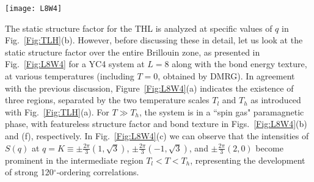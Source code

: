\documentclass[aps,prx,twocolumn,showpacs,psfig,superscriptaddress,longbibliography]{revtex4-1}
\newcommand{\Fig}[1]{Fig.~\ref{#1}}
\begin{document}
\begin{figure*}[tbp]
\texttt{[image: L8W4]}
\caption{(Color online)
 {(a) Finite-temperature phase diagram of TLH on a YC4 lattice, which consists of high-$T$ ``gas", intermediate-$T$ liquid, and low-$T$ solid states. (b-e) show the static structure factor at four representative temperature points (left to right, from high temperature to low), and (f-i) exhibit corresponding bond textures at finite-$T$, and the values are the bond energies to whose absolute value the thickness of nearest neighbor bonds are proportional. In (i) we also show the bond energy distribution at $T=0$ calculated by DMRG, where the agreement between XTRG results (left half) at low-$T$ and DMRG data (right half) is apparent, and one can recognize the strip solid structure quite distinctly. 
Dashed lines are guide for eyes, representing in (e) the line connecting two inequivalent $M$ points (labelled as $M_1$ and $M_2$) with enhanced intensity. In (f) we label the X and Y directions, as well as the way we wrap the lattice into a Y cylinder.}
}
\label{Fig:L8W4}
\end{figure*}


 {The static structure factor for the THL is analyzed at specific values
of $q$ in \Fig{Fig:TLH}(b). However, before discussing these in detail,
let us look at the static structure factor over the entire Brillouin zone,
as presented in \Fig{Fig:L8W4} for a YC4 system at $L=8$
along with the bond energy texture, at various temperatures (including $T=0$, obtained by DMRG). 
In agreement with the previous discussion,
Figure~\ref{Fig:L8W4}(a) indicates the existence of three regions, separated
by the two temperature scales $T_l$ and $T_h$ 
as introduced with \Fig{Fig:TLH}(a). For $T\gg T_h$, the system is in a ``spin gas" paramagnetic phase, with featureless structure factor and bond texture in Figs.~\ref{Fig:L8W4}(b) and (f), respectively. In Fig.~\ref{Fig:L8W4}(c) we can observe that the intensities of $S(q)$ at $q=K \equiv \pm \frac{2\pi}{3}(1, \sqrt{3})$, $\pm \frac{2\pi}{3}(-1, \sqrt{3})$, and $\pm \frac{2\pi}{3}(2, 0)$ become prominent in the intermediate region $T_l< T<T_h$, representing the development of strong 120$^{\circ}$-ordering correlations.}
\end{document}

